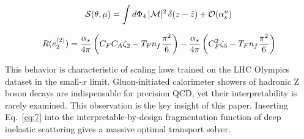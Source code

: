 \begin{equation}
  \mathcal{S}(\theta, \mu) = \int d\Phi_{4} \, |\mathcal{M}|^2 \, \delta(z - \hat{z}) + \mathcal{O}(\alpha_s^{n})
  \label{eq:9}
\end{equation}

\begin{equation}
  R(e_2^{(2)}) = \frac{\alpha_s}{4\pi} \left( C_F C_A \zeta_{2} - T_F n_f \frac{\pi^2}{6} \right) - \frac{\alpha_s}{4\pi} \left( C_F^2 \zeta_{5} - T_F n_f \frac{\pi^2}{6} \right)
  \label{eq:10}
\end{equation}

This behavior is characteristic of scaling laws trained on the LHC
Olympics dataset in the small-$x$ limit. Gluon-initiated calorimeter
showers of hadronic Z boson decays are indispensable for precision QCD,
yet their interpretability is rarely examined. This observation is the
key insight of this paper. Inserting Eq.~\eqref{eq:7} into the
interpretable-by-design fragmentation function of deep inelastic
scattering gives a massive optimal transport solver.

